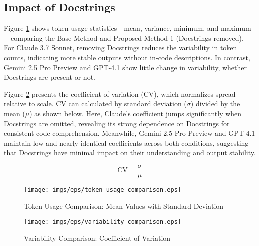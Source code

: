 \subsection{Impact of Docstrings}
Figure \ref{fig:token_usage_comparison} shows token usage statistics—mean, variance, minimum, and maximum—comparing the Base Method and Proposed Method 1 (Docstrings removed). For Claude 3.7 Sonnet, removing Docstrings reduces the variability in token counts, indicating more stable outputs without in-code descriptions. In contrast, Gemini 2.5 Pro Preview and GPT-4.1 show little change in variability, whether Docstrings are present or not.

Figure \ref{fig:variablity_comparison} presents the coefficient of variation (CV), which normalizes spread relative to scale. CV can calculated by standard deviation ($\sigma$) divided by the mean ($\mu$) as shown below. Here, Claude’s coefficient jumps significantly when Docstrings are omitted, revealing its strong dependence on Docstrings for consistent code comprehension. Meanwhile, Gemini 2.5 Pro Preview and GPT-4.1 maintain low and nearly identical coefficients across both conditions, suggesting that Docstrings have minimal impact on their understanding and output stability.

\[
\mathrm{CV} = \frac{\sigma}{\mu}
\]

\begin{figure}[htbp]
    \centering
    \texttt{[image: imgs/eps/token\_usage\_comparison.eps]}
    \caption{Token Usage Comparison: Mean Values with Standard Deviation}
    \label{fig:token_usage_comparison}
\end{figure}



\begin{figure}[htbp]
    \centering
    \texttt{[image: imgs/eps/variability\_comparison.eps]}
    \caption{Variability Comparison: Coefficient of Variation}
    \label{fig:variablity_comparison}
\end{figure}
